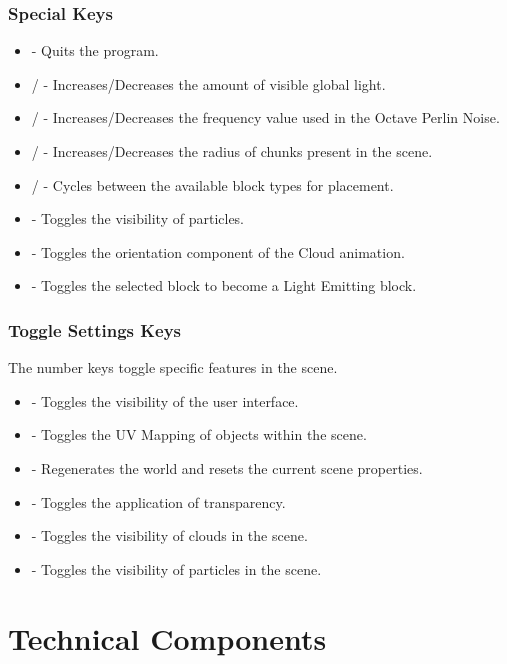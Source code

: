\documentclass{book}
\begin{document}
\subsection{Special Keys}
\begin{itemize}
	\item {} - Quits the program. 
	\item {}/ - Increases/Decreases the amount of visible global light.
	\item {}/ - Increases/Decreases the frequency value used in the Octave Perlin Noise.
	\item {}/ - Increases/Decreases the radius of chunks present in the scene.
	\item {}/ - Cycles between the available block types for placement.
	\item {} - Toggles the visibility of particles.
	\item {} - Toggles the orientation component of the Cloud animation.
	\item {} - Toggles the selected block to become a Light Emitting block.
\end{itemize}
      
\subsection{Toggle Settings Keys}
The number keys toggle specific features in the scene.
      
\begin{itemize}
	\item {} - Toggles the visibility of the user interface.
	\item {} - Toggles the UV Mapping of objects within the scene.
	\item {} - Regenerates the world and resets the current scene properties.
	\item {} - Toggles the application of transparency.
	\item {} - Toggles the visibility of clouds in the scene.
	\item {} - Toggles the visibility of particles in the scene.
\end{itemize}


\chapter{Technical Components}
\end{document}
